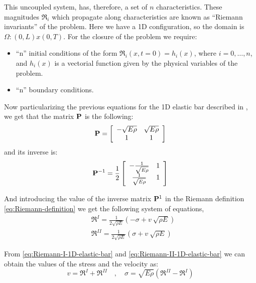 This uncoupled system, has, therefore, a set of $n$ characteristics.
These magnitudes $\Re_i$ which propagate along characteristics are
known as ``Riemann invariants'' of the problem. Here we have a 1D
configuration, so the domain is $\Omega : \left(0, L\right) x \left(0,
  T\right)$. For the closure of the problem we require:
\begin{itemize}
\item ``n'' initial conditions of the form $\Re_i (x,t=0) = h_i(x)$,
  where $i = {0, \ldots, n}$, and $h_i(x)$ is a vectorial function
  given by the physical variables of the problem.
\item ``n'' boundary conditions.
\end{itemize}

Now particularizing the previous equations for the 1D elastic bar
described in \cite{Dyka1995}, we get that the matrix $\mathbf{{P}}$
is the following:
\begin{equation*}
    \mathbf{{P}} =  \left[
    \begin{array}{cc}
      -\sqrt{E\rho} & \sqrt{E\rho}\\
       1 & 1 
    \end{array} \right]
\end{equation*}
and its inverse is:
\begin{equation*}
    \mathbf{{P}}^{-1} = \frac{1}{2} \left[
    \begin{array}{cc}
      -\frac{1}{\sqrt{E\rho}} & 1\\
      \frac{1}{\sqrt{E\rho}} & 1 
    \end{array} \right]
\end{equation*}

And introducing the value of the inverse matrix $\mathbf{{P}}^1$ in the
Riemann definition \eqref{eq:Riemann-definition} we get the following
system of equations,
\begin{align}
  \label{eq:Riemann-I-1D-elastic-bar}
  &\Re^{I} = \frac{1}{2\sqrt{\rho E}}\left(-\sigma + v\ \sqrt{\rho E}
    \right)\\
  \label{eq:Riemann-II-1D-elastic-bar}
  &\Re^{II} = \frac{1}{2\sqrt{\rho E}}\left(\sigma + v\ \sqrt{\rho E} \right)
\end{align}

From \eqref{eq:Riemann-I-1D-elastic-bar} and
\eqref{eq:Riemann-II-1D-elastic-bar} we can obtain the values of the
stress and the velocity as:
\begin{equation}
  \label{eq:Riemann-stress-velocity}
  v = \Re^{I} + \Re^{II} \quad , \quad \sigma = \sqrt{E \rho}\left(\Re^{II} - \Re^{I} \right)
\end{equation}

